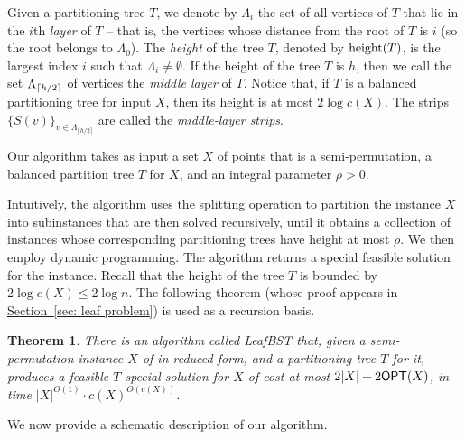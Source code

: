 \documentclass[11pt]{article}
\numberwithin{equation}{section}
\newtheorem{theorem}{Theorem}[section]
\theoremstyle{definition}
\theoremstyle{plain}
\newcommand{\expref}[2]{\hyperref[#2]{#1~\ref{#2}}}
\begin{document}
Given a partitioning tree $T$, we denote by $\Lambda_i$ the set of all vertices of $T$ that lie in the $i$th \emph{layer} of $T$ -- that is, the vertices whose distance from the root of $T$ is $i$ (so the root belongs to $\Lambda_0$). The \emph{height} of the tree $T$, denoted by $\operatorname{height}(T)$, is the largest index $i$ such that $\Lambda_i\neq \emptyset$. If the height of the tree $T$ is $h$, then we call the set  $\Lambda_{\left\lceil h/2\right\rceil}$ of vertices the \emph{middle layer} of $T$. Notice that, if $T$ is a balanced partitioning tree for input $X$, then its height is at most $2 \log c(X)$. The strips $\{S(v)\}_{v \in \Lambda_{\lceil h/2 \rceil}}$ are called the \textit{middle-layer strips}. 


Our algorithm takes as input a set $X$ of points that is a semi-permutation, a balanced partition tree $T$ for $X$,  and an integral parameter $\rho>0$. 
%

Intuitively, the algorithm uses the splitting operation to partition the instance $X$ into subinstances that are then solved recursively, until it obtains a collection of instances whose corresponding partitioning trees have height at most $\rho$. We then  employ dynamic programming. 
The algorithm returns a special feasible solution for the instance. 
Recall that the height of the tree $T$ is bounded by $2\log c(X)\leq 2\log n$. 
%
%
The following theorem (whose proof appears in \expref{Section}{sec: leaf problem}) is used as a recursion basis. 

\begin{theorem}
	\label{thm: leaf problem1} 
	There is an algorithm called {\sc LeafBST} that, given a semi-permutation instance $X$ of \minsat in reduced form, and a partitioning tree $T$ for it, produces a feasible $T$-special solution for $X$ of cost at most $2 |X| + 2\mbox{\sf OPT}(X)$, in time $|X|^{O(1)} \cdot c(X)^{O(c(X))}$.
\end{theorem}


%
%
%
%


We now provide a schematic description of our algorithm. 
%



%
\end{document}
